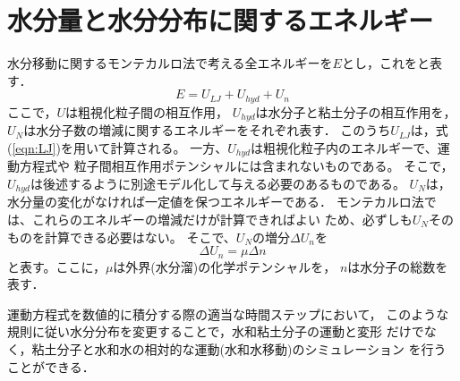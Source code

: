 \section{水分量と水分分布に関するエネルギー}
水分移動に関するモンテカルロ法で考える全エネルギーを$E$とし，これをと表す．
\begin{equation}
	E=U_{LJ} +U_{hyd} + U_n
	\label{eqn:}
\end{equation}
ここで，$U$は粗視化粒子間の相互作用，
$U_{hyd}$は水分子と粘土分子の相互作用を，
$U_N$は水分子数の増減に関するエネルギーをそれぞれ表す．
このうち$U_{LJ}$は，式(\ref{eqn:LJ})を用いて計算される。
一方、$U_{hyd}$は粗視化粒子内のエネルギーで、運動方程式や
粒子間相互作用ポテンシャルには含まれないものである。
そこで，$U_{hyd}$は後述するように別途モデル化して与える必要のあるものである。
$U_N$は，水分量の変化がなければ一定値を保つエネルギーである．
モンテカルロ法では、これらのエネルギーの増減だけが計算できればよい
ため、必ずしも$U_N$そのものを計算できる必要はない。
そこで、$U_N$の増分$\Delta U_n$を
\begin{equation}
	\Delta U_n =\mu \Delta n
	\label{eqn:}
\end{equation}
と表す。ここに，$\mu$は外界(水分溜)の化学ポテンシャルを，
$n$は水分子の総数を表す．

運動方程式を数値的に積分する際の適当な時間ステップにおいて，
このような規則に従い水分分布を変更することで，水和粘土分子の運動と変形
だけでなく，粘土分子と水和水の相対的な運動(水和水移動)のシミュレーション
を行うことができる．
